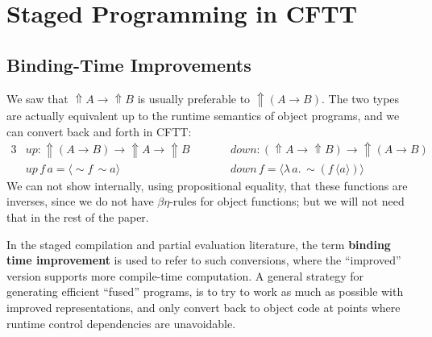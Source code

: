 \documentclass[acmsmall,screen,review,anonymous]{acmart}
\newcommand{\mit}[1]{\mathit{#1}}
\newcommand{\bs}[1]{\boldsymbol{#1}}
\newcommand{\ind}{\hspace{1em}}
\newcommand{\lam}{\lambda\,}
\newcommand{\Up}{{\Uparrow}}
\newcommand{\spl}{{\bs{\sim}}}
\newcommand{\ql}{{\bs{\langle}}}
\newcommand{\qr}{{\bs{\rangle}}}
\theoremstyle{remark}
\newcommand{\mup}{\mit{up}}
\newcommand{\mdown}{\mit{down}}
\begin{document}
\section{Staged Programming in CFTT}\label{sec:abstractions-in-cftt}

\subsection{Binding-Time Improvements}\label{sec:binding-time-improvements}

We saw that $\Up A \to \Up B$ is usually preferable to $\Up(A \to B)$. The two
types are actually equivalent up to the runtime semantics of object programs,
and we can convert back and forth in CFTT:
\begin{alignat*}{3}
  &\mup : \Up (A \to B) \to \Up A \to \Up B && \ind\ind \mdown : (\Up A \to \Up B) \to \Up (A \to B) \\
  &\mup\,f\,a = \ql \spl f\, \spl a\qr   && \ind\ind \mdown\,f = \ql \lam a.\,\spl(f\,\ql a \qr) \qr
\end{alignat*}
We can not show internally, using propositional equality, that these functions are
inverses, since we do not have $\beta\eta$-rules for object functions; but we
will not need that in the rest of the paper.

In the staged compilation and partial evaluation literature, the term
\textbf{binding time improvement} is used to refer to such conversions, where
the ``improved'' version supports more compile-time computation. A general
strategy for generating efficient ``fused'' programs, is to try to work as much
as possible with improved representations, and only convert back to object code
at points where runtime control dependencies are unavoidable.
\end{document}
